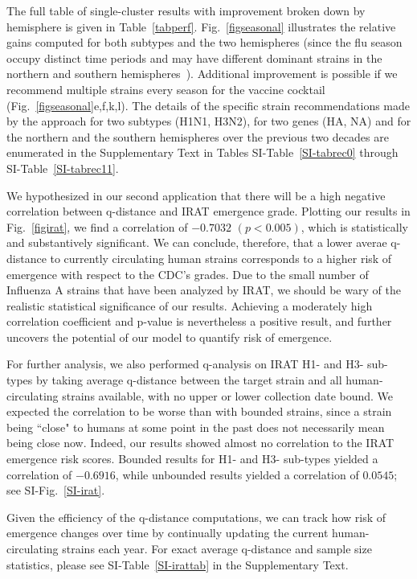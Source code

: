 \documentclass[onecolumn, compsoc,10pt]{IEEEtran}
\begin{document}
The full table of single-cluster results with improvement broken down by hemisphere is given in Table~\ref{tabperf}. Fig.~\ref{figseasonal} illustrates the relative gains computed for both subtypes and the two hemispheres (since the flu season occupy distinct time periods and may have different dominant strains in the northern and southern hemispheres~\cite{boni2008vaccination}). Additional improvement is possible if we recommend multiple strains every season for the vaccine cocktail (Fig.~\ref{figseasonal}e,f,k,l). The details of the specific strain  recommendations made by the \qnet approach for two subtypes (H1N1, H3N2), for two genes (HA, NA) and for the northern and the southern hemispheres over the previous two decades are enumerated in the Supplementary Text in Tables SI-Table~\ref{SI-tabrec0} through SI-Table~\ref{SI-tabrec11}.

We hypothesized in our second application that there will be a high negative correlation between q-distance and IRAT emergence grade. Plotting our results in Fig.~\ref{figirat}, we find a correlation of $-0.7032$ $(p < 0.005)$, which is statistically and substantively significant. We can conclude, therefore, that a lower averae q-distance to currently circulating human strains corresponds to a higher risk of emergence with respect to the CDC's grades. Due to the small number of Influenza A strains that have been analyzed by IRAT, we should be wary of the realistic statistical significance of our results. Achieving a moderately high correlation coefficient and p-value is nevertheless a positive result, and further uncovers the potential of our model to quantify risk of emergence. 

For further analysis, we also performed q-analysis on IRAT H1- and H3- sub-types by taking average q-distance between the target strain and all human-circulating strains available, with no upper or lower collection date bound. We expected the correlation to be worse than with bounded strains, since a strain being ``close" to humans at some point in the past does not necessarily mean being close now. Indeed, our results showed almost no correlation to the IRAT emergence risk scores. Bounded results for H1- and H3- sub-types yielded a correlation of $-0.6916$, while unbounded results yielded a correlation of $0.0545$; see SI-Fig.~\ref{SI-irat}.

Given the efficiency of the q-distance computations, we can track how risk of emergence changes over time by continually updating the current human-circulating strains each year. For exact average q-distance and \qnet sample size statistics, please see SI-Table~\ref{SI-irattab} in the Supplementary Text.
\end{document}
